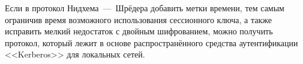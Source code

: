 Если в протокол Нидхема~---~Шрёдера добавить метки времени, тем самым ограничив время возможного использования сессионного ключа, а также исправить мелкий недостаток с двойным шифрованием, можно получить протокол, который лежит в основе распространённого средства аутентификации <<Kerberos>> для локальных сетей.

